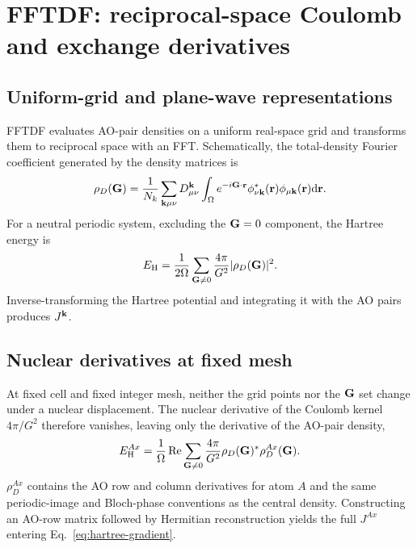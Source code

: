 \section{FFTDF: reciprocal-space Coulomb and exchange derivatives}
\label{sec:fftdf}

\subsection{Uniform-grid and plane-wave representations}

FFTDF evaluates AO-pair densities on a uniform real-space grid and transforms
them to reciprocal space with an FFT.  Schematically, the total-density
Fourier coefficient generated by the density matrices is
\begin{equation}
  \rho_D(\mathbf{G})
  =\frac{1}{N_k}\sum_{\mathbf{k}\mu\nu}
   D_{\mu\nu}^{\mathbf{k}}
   \int_\Omega e^{-i\mathbf{G}\cdot\mathbf r}
   \phi_{\nu\mathbf{k}}^{*}(\mathbf r)
   \phi_{\mu\mathbf{k}}(\mathbf r)\mathrm{d}\mathbf r.
  \label{eq:fftdf-density-fourier}
\end{equation}
For a neutral periodic system, excluding the $\mathbf{G}=0$ component, the Hartree
energy is
\begin{equation}
  E_{\mathrm H}
  =\frac{1}{2\Omega}\sum_{\mathbf{G}\ne0}
   \frac{4\pi}{G^2}|\rho_D(\mathbf{G})|^2.
  \label{eq:fftdf-hartree-energy}
\end{equation}
Inverse-transforming the Hartree potential and integrating it with the AO
pairs produces $J^{\mathbf{k}}$.

\subsection{Nuclear derivatives at fixed mesh}

At fixed cell and fixed integer mesh, neither the grid points nor the $\mathbf{G}$ set
change under a nuclear displacement.  The nuclear derivative of the Coulomb
kernel $4\pi/G^2$ therefore vanishes, leaving only the derivative of the AO-pair
density,
\begin{equation}
  E_{\mathrm H}^{Ax}
  =\frac{1}{\Omega}\operatorname{Re}
   \sum_{\mathbf{G}\ne0}\frac{4\pi}{G^2}
   \rho_D(\mathbf{G})^*\rho_D^{Ax}(\mathbf{G}).
  \label{eq:fftdf-hartree-derivative}
\end{equation}
$\rho_D^{Ax}$ contains the AO row and column derivatives for atom $A$ and the
same periodic-image and Bloch-phase conventions as the central density.
Constructing an AO-row matrix followed by Hermitian reconstruction yields the
full $J^{Ax}$ entering Eq.~\eqref{eq:hartree-gradient}.

